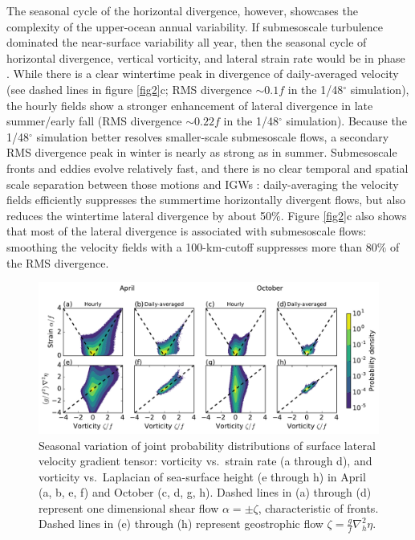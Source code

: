 \documentclass[grl]{agutex2015}
\begin{document}
\begin{article}
The seasonal cycle of the horizontal divergence, however, showcases the complexity
of the upper-ocean annual variability. If submesoscale turbulence dominated
the near-surface variability all year, then the seasonal cycle of horizontal divergence,
vertical vorticity, and lateral strain rate would be in phase \citep[e.g.,][]{sasaki_etal2014}.
While there is a clear wintertime peak in divergence of daily-averaged velocity
(see dashed lines in figure \ref{fig2}c; RMS divergence $\sim0.1 f$ in the 1/48$^\circ$
simulation), the hourly fields show
a stronger enhancement of
lateral divergence in late summer/early fall (RMS divergence $\sim0.22 f$ in the 1/48$^\circ$
simulation). Because the 1/48$^\circ$ simulation better resolves
smaller-scale submesoscale flows, a secondary RMS divergence peak in winter  is
nearly as strong as in summer. Submesoscale fronts and eddies evolve
relatively fast, and there is no clear
temporal and spatial scale separation between those motions and IGWs
\citep[][]{mcwilliams2016}:
daily-averaging the velocity fields efficiently suppresses the summertime horizontally
divergent flows, but also reduces the wintertime lateral divergence by about 50$\%$.
Figure \ref{fig2}c also shows that most of the lateral divergence is associated
with submesoscale flows: smoothing the velocity fields with a 100-km-cutoff
suppresses more than 80$\%$ of the RMS divergence.


\begin{figure}[ht]
  \begin{center}
    \includegraphics[width=.8\textwidth]{figs/fig3.pdf}
 \caption{\small Seasonal variation of joint probability distributions of
          surface lateral velocity gradient tensor:  vorticity vs.\
          strain rate (a through d),
          and vorticity vs.\ Laplacian of sea-surface height (e through h) in April (a, b,
          e, f) and October (c, d, g, h).
          Dashed lines in (a) through (d) represent one dimensional shear flow $\alpha = \pm\zeta$,
          characteristic of fronts. Dashed lines in (e) through
          (h) represent geostrophic flow $\zeta = \frac{g}{f}\nabla_h^2 \eta$.}
 \label{fig3}
 \end{center}
\end{figure}


\end{article}
\end{document}
